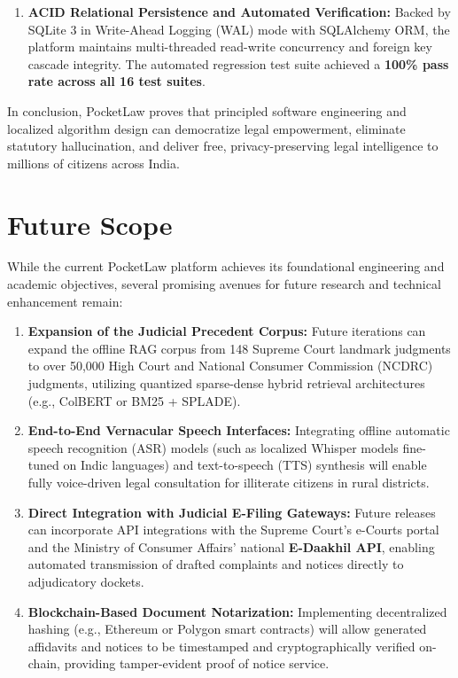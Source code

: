 \begin{enumerate}
    \item \textbf{ACID Relational Persistence and Automated Verification:}
    Backed by SQLite 3 in Write-Ahead Logging (WAL) mode with SQLAlchemy ORM, the platform maintains multi-threaded read-write concurrency and foreign key cascade integrity. The automated regression test suite achieved a \textbf{100\% pass rate across all 16 test suites}.
\end{enumerate}

In conclusion, PocketLaw proves that principled software engineering and localized algorithm design can democratize legal empowerment, eliminate statutory hallucination, and deliver free, privacy-preserving legal intelligence to millions of citizens across India.

\section{Future Scope}
\label{sec:future_scope}

While the current PocketLaw platform achieves its foundational engineering and academic objectives, several promising avenues for future research and technical enhancement remain:

\begin{enumerate}
    \item \textbf{Expansion of the Judicial Precedent Corpus:}
    Future iterations can expand the offline RAG corpus from 148 Supreme Court landmark judgments to over 50,000 High Court and National Consumer Commission (NCDRC) judgments, utilizing quantized sparse-dense hybrid retrieval architectures (e.g., ColBERT or BM25 + SPLADE).
    
    \item \textbf{End-to-End Vernacular Speech Interfaces:}
    Integrating offline automatic speech recognition (ASR) models (such as localized Whisper models fine-tuned on Indic languages) and text-to-speech (TTS) synthesis will enable fully voice-driven legal consultation for illiterate citizens in rural districts.
    
    \item \textbf{Direct Integration with Judicial E-Filing Gateways:}
    Future releases can incorporate API integrations with the Supreme Court's e-Courts portal and the Ministry of Consumer Affairs' national \textbf{E-Daakhil API}, enabling automated transmission of drafted complaints and notices directly to adjudicatory dockets.
    
    \item \textbf{Blockchain-Based Document Notarization:}
    Implementing decentralized hashing (e.g., Ethereum or Polygon smart contracts) will allow generated affidavits and notices to be timestamped and cryptographically verified on-chain, providing tamper-evident proof of notice service.
\end{enumerate}
